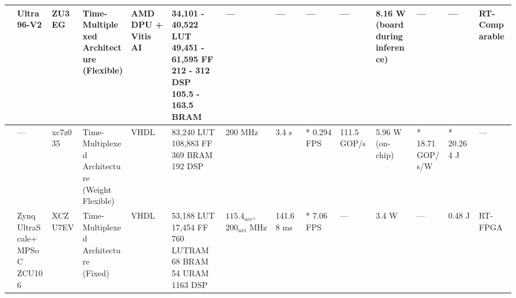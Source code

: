 \begin{center}
{\begin{tabular}{llllllllllllll}
\cite{cosmasUtilizationFPGAOnboard2020} & Ultra96-V2 & ZU3EG & \makecell[tl]{Time-Multiplexed\\ Architecture\\ (Flexible)} & \makecell[tl]{AMD DPU + \\Vitis AI} & \makecell[tl]{34,101 - 40,522 LUT\\ 49,451 - 61,595 FF\\ 212 - 312 DSP\\ 105.5 - 163.5 BRAM} & --- & --- & --- & --- & \makecell[tl]{8.16 W\\ (board during\\ inference)} & --- & --- & \makecell[tl]{RT-\\Comparable} \\ \hline
\cite{zhangFPGAImplementationCNNBased2021} & --- & xc7z035 & \makecell[tl]{Time-Multiplexed\\ Architecture\\ (Weight Flexible)} & VHDL & \makecell[tl]{83,240 LUT\\ 108,883 FF\\ 369 BRAM\\ 192 DSP} & 200 MHz & 3.4 s & * 0.294 FPS & 111.5 GOP/s & \makecell[tl]{5.96 W\\ (on-chip)} & \makecell[tl]{* 18.71\\ GOP/s/W} & * 20.264 J & --- \\ \hline
\cite{rapuanoFPGABasedHardwareAccelerator2021} & \makecell[tl]{Zynq\\ UltraScale+\\ MPSoC\\ ZCU106} & XCZU7EV & \makecell[tl]{Time-Multiplexed\\ Architecture\\ (Fixed)} & VHDL & \makecell[tl]{53,188 LUT\\ 17,454 FF\\ 760 LUTRAM\\ 68 BRAM\\ 54 URAM\\ 1163 DSP} & \makecell[tl]{$115.4_{acc}$, $200_{axi}$\\ MHz} & \makecell[tl]{141.68 ms\\} & * 7.06 FPS & --- & 3.4 W & --- & 0.48 J & RT-FPGA \\ \hline

\end{tabular}}
\end{center}
